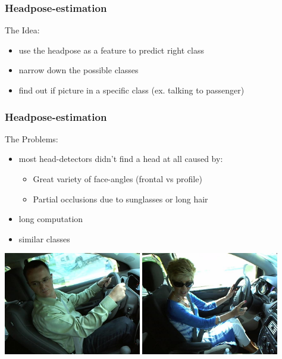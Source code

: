 \documentclass{beamer}
\begin{document}
	\begin{frame}
		\frametitle{Headpose-estimation}
		The Idea:
		\begin{itemize}
			\item use the headpose as a feature to predict right class
			\item narrow down the possible classes
			\item find out if picture in a specific class (ex. talking to passenger)
		\end{itemize}
	\end{frame}

	\begin{frame}
		\frametitle{Headpose-estimation}
		The Problems:
		\begin{itemize}
			\item most head-detectors didn't find a head at all caused by:
				\begin{itemize}
					\item Great variety of face-angles (frontal vs profile)
					\item Partial occlusions due to sunglasses or long hair
				\end{itemize}
			\item long computation
			\item similar classes
		\end{itemize}
		\includegraphics[width=0.45\textwidth]{img_89653} \vspace{0.1cm}
        \includegraphics[width=0.45\textwidth]{c_0_angle2_passenger}
	\end{frame}
\end{document}
